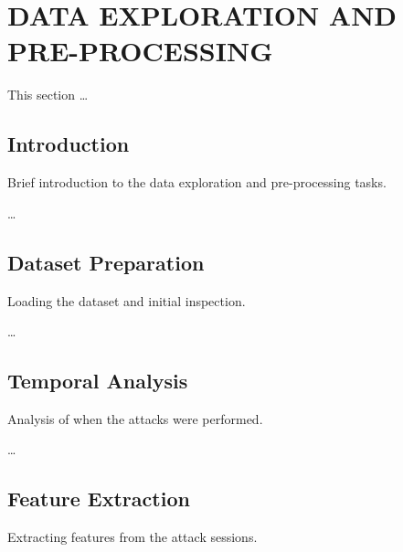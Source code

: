 

\section{DATA EXPLORATION AND PRE-PROCESSING}

    This section \ldots

    \subsection{Introduction}

        Brief introduction to the data exploration and pre-processing tasks.

        \ldots

    \subsection{Dataset Preparation}
    
        Loading the dataset and initial inspection.

        \ldots

    \subsection{Temporal Analysis}
    
        Analysis of when the attacks were performed.

        \ldots

    \subsection{Feature Extraction}
    
        Extracting features from the attack sessions.

